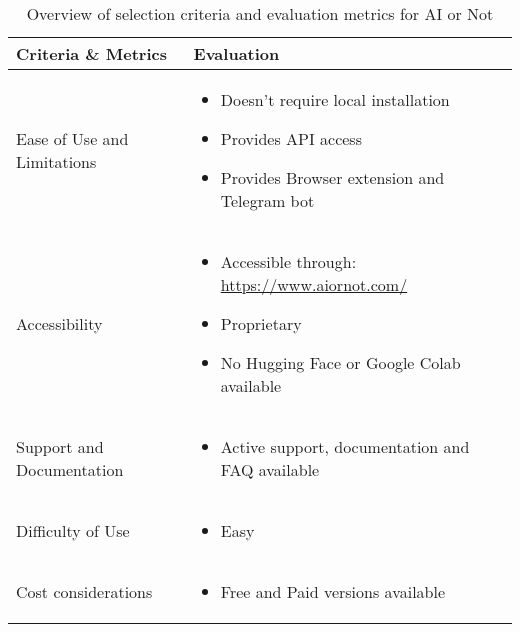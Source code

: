 \begin{table}[htpb]
	\caption{Overview of selection criteria and evaluation metrics for AI or Not}\label{tab:ai-or-not-overview}
	\centering
	\small
	\begin{tabularx}{\textwidth}{l X}
		\toprule
		\textbf{Criteria \& Metrics} & \textbf{Evaluation}                                                   \\
		\midrule
		Ease of Use and Limitations  & \begin{itemize}
			                               \item Doesn't require local installation
			                               \item Provides \ac{API} access
			                               \item Provides Browser extension and Telegram bot
		                               \end{itemize}                      \\
		\addlinespace
		Accessibility                & \begin{itemize}
			                               \item Accessible through: \url{https://www.aiornot.com/}
			                               \item Proprietary
			                               \item No Hugging Face or Google Colab available
		                               \end{itemize}               \\
		\addlinespace
		Support and Documentation    & \begin{itemize}
			                               \item Active support, documentation and FAQ available
		                               \end{itemize}                  \\
		\addlinespace
		Difficulty of Use            & \begin{itemize}
			                               \item Easy
		                               \end{itemize}                                                        \\
		\addlinespace
		Cost considerations          & \begin{itemize}
			                               \item Free and Paid versions available
		                               \end{itemize}                                 \\

\end{tabularx}
\end{table}
